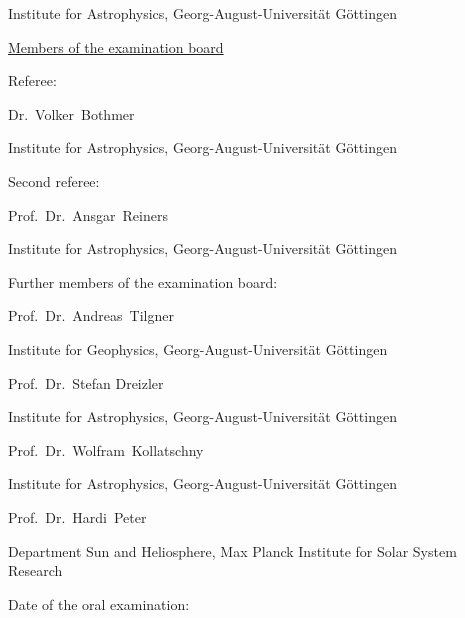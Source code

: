 Institute for Astrophysics, Georg-August-Universität Göttingen
% 
\vspace{3\baselineskip}

\noindent \underline{Members of the examination board}
\vspace{\baselineskip}

\noindent Referee:
\medskip

Dr.~Volker~Bothmer

Institute for Astrophysics, Georg-August-Universität Göttingen
\vspace{\baselineskip}

\noindent Second referee:
\medskip

Prof.~Dr.~Ansgar~Reiners

Institute for Astrophysics, Georg-August-Universität Göttingen
% 
% 
\vspace{\baselineskip}

\noindent Further members of the examination board:
\medskip

Prof.~Dr.~Andreas~Tilgner

Institute for Geophysics, Georg-August-Universität Göttingen
\vspace{\baselineskip}

Prof.~Dr.~Stefan Dreizler

Institute for Astrophysics, Georg-August-Universität Göttingen
\vspace{\baselineskip}

Prof.~Dr.~Wolfram~Kollatschny

Institute for Astrophysics, Georg-August-Universität Göttingen
\vspace{\baselineskip}

Prof.~Dr.~Hardi~Peter

Department Sun and Heliosphere, Max Planck Institute for Solar System Research
\vspace{3\baselineskip}

\noindent Date of the oral examination: \underline{\hspace{3cm}}


\cleardoublepage


